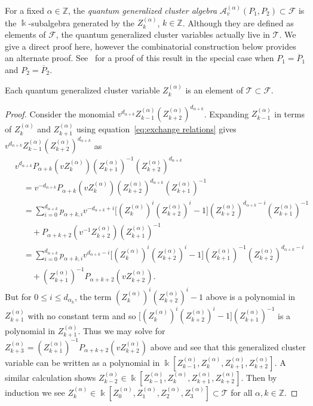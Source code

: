 \documentclass[ALCO,ThmDefs,Unicode,epreuves]{cedram}
\newcommand{\cA}{\mathcal{A}}
\newcommand{\cF}{\mathcal{F}}
\newcommand{\cT}{\mathcal{T}}
\newcommand{\kk}{\Bbbk}
\newcommand{\ZZ}{\mathbb{Z}}
\begin{document}
For a fixed $\alpha\in\ZZ$, the \emph{quantum generalized cluster algebra} $\cA^{(\alpha)}_v(P_1,P_2)\subset\cF$ is the $\kk$-subalgebra generated by the $Z^{(\alpha)}_k$, $k\in\ZZ$.
Although they are defined as elements of $\cF$, the quantum generalized cluster variables actually live in $\cT$.
We give a direct proof here, however the combinatorial construction below provides an alternate proof.
See~\cite{bai-chen-ding-xu} for a proof of this result in the special case when $P_1=\overline{P}_1$ and $P_2=\overline{P}_2$.
\begin{theorem}
 Each quantum generalized cluster variable $Z^{(\alpha)}_k$ is an element of $\cT\subset\cF$.
\end{theorem}
\begin{proof}
 Consider the monomial $v^{d_{\alpha+k}}Z^{(\alpha)}_{k-1}(Z^{(\alpha)}_{k+2})^{d_{\alpha+k}}$.
 Expanding $Z^{(\alpha)}_{k-1}$ in terms of $Z^{(\alpha)}_k$ and $Z^{(\alpha)}_{k+1}$ using equation~\eqref{eq:exchange relations} gives $v^{d_{\alpha+k}}Z^{(\alpha)}_{k-1}(Z^{(\alpha)}_{k+2})^{d_{\alpha+k}}$ as
 \begin{align*}
 &v^{d_{\alpha+k}}P_{\alpha+k}(vZ^{(\alpha)}_k)(Z^{(\alpha)}_{k+1})^{-1}(Z^{(\alpha)}_{k+2})^{d_{\alpha+k}}\\
 &\quad=v^{-d_{\alpha+k}}P_{\alpha+k}(vZ^{(\alpha)}_k)(Z^{(\alpha)}_{k+2})^{d_{\alpha+k}}(Z^{(\alpha)}_{k+1})^{-1}\\
 &\quad=\sum\limits_{i=0}^{d_{\alpha+k}}p_{\alpha+k,i}v^{-d_{\alpha+k}+i}\big[(Z^{(\alpha)}_k)^i(Z^{(\alpha)}_{k+2})^i-1\big](Z^{(\alpha)}_{k+2})^{d_{\alpha+k}-i}(Z^{(\alpha)}_{k+1})^{-1}\\
 &\qquad+P_{\alpha+k+2}(v^{-1}Z^{(\alpha)}_{k+2})(Z^{(\alpha)}_{k+1})^{-1}\\
 &\quad=\sum\limits_{i=0}^{d_{\alpha+k}}p_{\alpha+k,i}v^{d_{\alpha+k}-i}\big[(Z^{(\alpha)}_k)^i(Z^{(\alpha)}_{k+2})^i-1\big](Z^{(\alpha)}_{k+1})^{-1}(Z^{(\alpha)}_{k+2})^{d_{\alpha+k}-i}\\
 &\qquad+(Z^{(\alpha)}_{k+1})^{-1}P_{\alpha+k+2}(vZ^{(\alpha)}_{k+2}).
 \end{align*}
 But for $0\le i\le d_{\alpha_k}$, the term $(Z^{(\alpha)}_k)^i(Z^{(\alpha)}_{k+2})^i-1$ above is a polynomial in $Z^{(\alpha)}_{k+1}$ with no constant term and so $\big[(Z^{(\alpha)}_k)^i(Z^{(\alpha)}_{k+2})^i-1\big](Z^{(\alpha)}_{k+1})^{-1}$ is a polynomial in $Z^{(\alpha)}_{k+1}$.
 Thus we may solve for $Z^{(\alpha)}_{k+3}=(Z^{(\alpha)}_{k+1})^{-1}P_{\alpha+k+2}(vZ^{(\alpha)}_{k+2})$ above and see that this generalized cluster variable can be written as a polynomial in $\kk[Z^{(\alpha)}_{k-1},Z^{(\alpha)}_k,Z^{(\alpha)}_{k+1},Z^{(\alpha)}_{k+2}]$.
 A similar calculation shows $Z^{(\alpha)}_{k-2}\in\kk[Z^{(\alpha)}_{k-1},Z^{(\alpha)}_k,Z^{(\alpha)}_{k+1},Z^{(\alpha)}_{k+2}]$.
 Then by induction we see $Z^{(\alpha)}_k\in\kk[Z^{(\alpha)}_0,Z^{(\alpha)}_1,Z^{(\alpha)}_2,Z^{(\alpha)}_3]\subset\cT$ for all $\alpha,k\in\ZZ$.
\end{proof}
\end{document}
